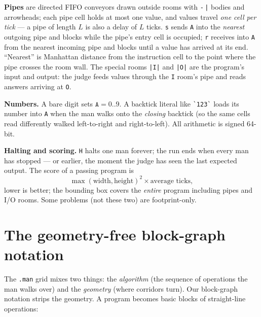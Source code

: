 \documentclass[11pt,a4paper]{article}
\newcommand{\op}[1]{\texttt{#1}}
\begin{document}
\textbf{Pipes} are directed FIFO conveyors drawn outside rooms with
\op{-}\,\op{|} bodies and arrowheads; each pipe cell holds at most one value,
and values travel \emph{one cell per tick} --- a pipe of length $L$ is also a
delay of $L$ ticks. \op{s} sends \op{A} into the \emph{nearest} outgoing pipe
and blocks while the pipe's entry cell is occupied; \op{r} receives into
\op{A} from the nearest incoming pipe and blocks until a value has arrived at
its end. ``Nearest'' is Manhattan distance from the instruction cell to the
point where the pipe crosses the room wall. The special rooms
\texttt{|I|} and \texttt{|O|} are the program's input and output: the judge
feeds values through the \texttt{I} room's pipe and reads answers arriving at
\texttt{O}.

\textbf{Numbers.} A bare digit sets $\op{A}=0..9$. A backtick literal like
\verb|`123`| loads its number into \op{A} when the man walks onto the
\emph{closing} backtick (so the same cells read differently walked
left-to-right and right-to-left). All arithmetic is signed 64-bit.

\textbf{Halting and scoring.} \op{H} halts one man forever; the run ends when
every man has stopped --- or earlier, the moment the judge has seen the last
expected output. The score of a passing program is
\[
  \max(\text{width},\text{height})^2 \times \text{average ticks},
\]
lower is better; the bounding box covers the \emph{entire} program including
pipes and I/O rooms. Some problems (not these two) are footprint-only.

\section{The geometry-free block-graph notation}

The \texttt{.man} grid mixes two things: the \emph{algorithm} (the sequence
of operations the man walks over) and the \emph{geometry} (where corridors
turn). Our block-graph notation strips the geometry. A program becomes basic
blocks of straight-line operations:
\end{document}
